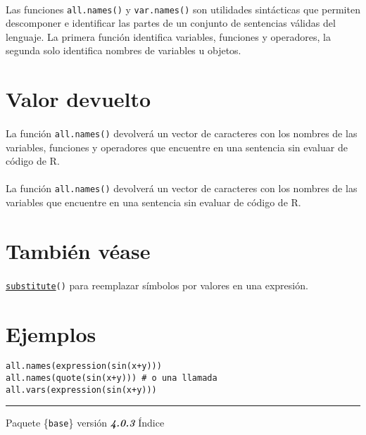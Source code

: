 \documentclass{article}[letter, 12pt]
\def\code#1{\texttt{#1}}
\begin{document}
\paragraph{}
Las funciones \code{all.names()} y \code{var.names()} son utilidades sintácticas que permiten descomponer e identificar las partes de un conjunto de sentencias válidas del lenguaje. La primera función identifica variables, funciones y operadores, la segunda solo identifica nombres de variables u objetos.
\section{\color{gray}Valor devuelto}
\paragraph{}
La función \code{all.names()} devolverá un vector de caracteres con los nombres de las variables, funciones y operadores que encuentre en una sentencia sin evaluar de código de R.
\paragraph{}
La función \code{all.names()} devolverá un vector de caracteres con los nombres de las variables que encuentre en una sentencia sin evaluar de código de R.
\section{\color{gray}También véase}
\paragraph{}
\href{run:/Vocabulary.pdf}{\code{substitute}}\code{()} para reemplazar símbolos por valores en una expresión.
\section{\color{gray}Ejemplos}
\code{all.names(expression(sin(x+y)))} \\
\code{all.names(quote(sin(x+y)))  \# o una llamada} \\
\code{all.vars(expression(sin(x+y)))} \\
\par\noindent\rule{\textwidth}{0.4pt}
\centerline{Paquete \{\code{base}\} versión \textbf{\emph{4.0.3}} Índice}
\end{document}
